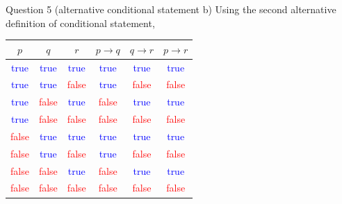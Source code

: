 \documentclass[10pt]{beamer}
\begin{document}
\begin{frame}[fragile]{Question 5 (alternative conditional statement b)}
Using the second alternative definition of conditional statement,
\begin{table}
\centering
\begin{tabular}{|c|c|c|c|c|c|} 
\hline
 $p$                    & $q$                     & $r$                     & $p \rightarrow q$       & $q \rightarrow r$       & $p \rightarrow r$        \\ 
\hline
\textcolor{blue}{true}  & \textcolor{blue}{true}  & \textcolor{blue}{true}  & \textcolor{blue}{true}  & \textcolor{blue}{true}  & \textcolor{blue}{true}   \\ 
\hline
\textcolor{blue}{true}  & \textcolor{blue}{true}  & \textcolor{red}{false}  & \textcolor{blue}{true}  & \textcolor{red}{false}  & \textcolor{red}{false}   \\ 
\hline
\textcolor{blue}{true}  & \textcolor{red}{false}  & \textcolor{blue}{true}  & \textcolor{red}{false}  & \textcolor{blue}{true}  & \textcolor{blue}{true}   \\ 
\hline
\textcolor{blue}{true}  & \textcolor{red}{false}  & \textcolor{red}{false}  & \textcolor{red}{false}  & \textcolor{red}{false}  & \textcolor{red}{false}   \\ 
\hline
\textcolor{red}{false}  & \textcolor{blue}{true}  & \textcolor{blue}{true}  & \textcolor{blue}{true}  & \textcolor{blue}{true}  & \textcolor{blue}{true}   \\ 
\hline
\textcolor{red}{false}  & \textcolor{blue}{true}  & \textcolor{red}{false}  & \textcolor{blue}{true}  & \textcolor{red}{false}  & \textcolor{red}{false}   \\ 
\hline
\textcolor{red}{false}  & \textcolor{red}{false}  & \textcolor{blue}{true}  & \textcolor{red}{false}  & \textcolor{blue}{true}  & \textcolor{blue}{true}   \\ 
\hline
\textcolor{red}{false}  & \textcolor{red}{false}  & \textcolor{red}{false}  & \textcolor{red}{false}  & \textcolor{red}{false}  & \textcolor{red}{false}   \\
\hline
\end{tabular}
\end{table}
\end{frame}
\end{document}
